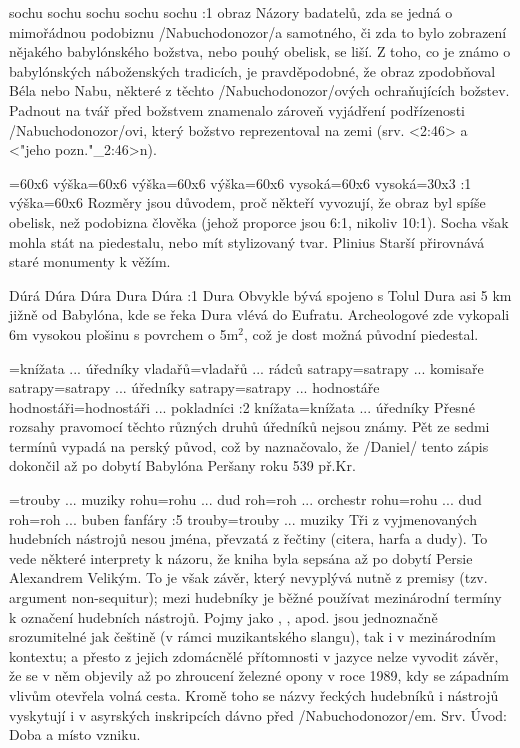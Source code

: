     {sochu} %
    {sochu}  %
    {sochu} %
    {sochu}  %
    {sochu}  %
:1 {obraz} Názory badatelů, zda se jedná o mimořádnou podobiznu  \x/Nabuchodonozor/a samotného, či zda to bylo zobrazení nějakého babylónského božstva, nebo pouhý obelisk, se liší. Z toho, co je známo o babylónských náboženských tradicích, je pravděpodobné, že obraz zpodobňoval Béla nebo Nabu, některé z těchto \x/Nabuchodonozor/ových ochraňujících božstev. Padnout na tvář před božstvem znamenalo zároveň vyjádření podřízenosti \x/Nabuchodonozor/ovi, který božstvo reprezentoval na zemi (srv. <2:46> a <"jeho pozn."_2:46>n). 

={60x6}  %
    {výška}={60x6} %
    {výška}={60x6}  %
    {výška}={60x6} %
    {vysoká}={60x6}  %
    {vysoká}={30x3}  %
:1 {výška}={60x6} Rozměry jsou důvodem, proč někteří vyvozují, že obraz byl spíše obelisk, než podobizna člověka (jehož proporce jsou 6:1, nikoliv 10:1). Socha však mohla stát na piedestalu, nebo mít stylizovaný tvar. Plinius Starší přirovnává staré monumenty k věžím.

    {Dúrá} %
    {Dúra}  %
    {Dúra} %
    {Dura}  %
    {Dúra}  %
:1 {Dura}  Obvykle bývá spojeno s Tolul Dura asi 5 km jižně od Babylóna, kde se řeka Dura vlévá do Eufratu. Archeologové zde vykopali 6m vysokou plošinu s povrchem o 5m$^2$, což je dost možná původní piedestal.

={knížata ... úředníky}  %
    {vladařů}={vladařů ... rádců} %
    {satrapy}={satrapy ... komisaře}  %
    {satrapy}={satrapy ... úředníky} %
    {satrapy}={satrapy ... hodnostáře}  %
    {hodnostáři}={hodnostáři ... pokladníci}  %
:2 {knížata}={knížata ... úředníky} Přesné rozsahy pravomocí těchto  různých druhů úředníků nejsou známy. Pět ze sedmi termínů vypadá na perský původ, což by naznačovalo, že \x/Daniel/ tento zápis dokončil až po dobytí Babylóna Peršany  roku 539 př.Kr.

={trouby ... muziky}  %
    {rohu}={rohu ... dud} %
    {roh}={roh ... orchestr}  %
    {rohu}={rohu ... dud} %
    {roh}={roh ... buben}  %
    {fanfáry}  %
:5 {trouby}={trouby ... muziky} Tři z vyjmenovaných  hudebních nástrojů  nesou jména, převzatá z řečtiny (citera, harfa a dudy). To vede některé interprety k názoru, že kniha byla sepsána až po dobytí Persie Alexandrem Velikým. 
To je však závěr, který nevyplývá nutně z premisy (tzv. argument non-sequitur); mezi hudebníky je běžné používat mezinárodní termíny k označení hudebních nástrojů. Pojmy jako  ,  ,  apod. jsou jednoznačně srozumitelné jak češtině (v rámci muzikantského slangu), tak i v mezinárodním kontextu; a přesto z jejich zdomácnělé přítomnosti v jazyce nelze vyvodit závěr, že se v něm objevily až po zhroucení železné opony v roce 1989, kdy se západním vlivům otevřela volná cesta. 
Kromě toho se názvy řeckých hudebníků i nástrojů vyskytují i v asyrských inskripcích dávno před \x/Nabuchodonozor/em. Srv. Úvod: Doba a místo vzniku.



